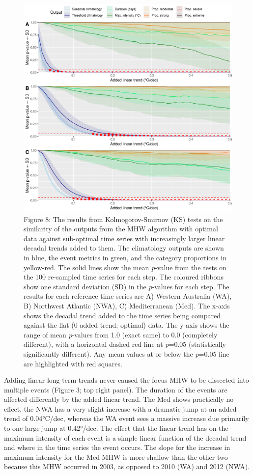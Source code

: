 \documentclass[utf8]{frontiersSCNS} %
\begin{document}
\begin{figure}
\centering
\includegraphics{../LaTeX/fig_8.png}
\caption{Figure 8: The results from Kolmogorov-Smirnov (KS) tests on the
similarity of the outputs from the MHW algorithm with optimal data
against sub-optimal time series with increasingly larger linear decadal
trends added to them. The climatology outputs are shown in blue, the
event metrics in green, and the category proportions in yellow-red. The
solid lines show the mean \emph{p}-value from the tests on the 100
re-sampled time series for each step. The coloured ribbons show one
standard deviation (SD) in the \emph{p}-values for each step. The
results for each reference time series are A) Western Australia (WA), B)
Northwest Atlantic (NWA), C) Mediterranean (Med). The x-axis shows the
decadal trend added to the time series being compared against the flat
(0 added trend; optimal) data. The y-axis shows the range of mean
\emph{p}-values from 1.0 (exact same) to 0.0 (completely different),
with a horizontal dashed red line at \emph{p}=0.05 (statistically
significantly different). Any mean values at or below the \emph{p}=0.05
line are highlighted with red squares.}
\end{figure}

Adding linear long-term trends never caused the focus MHW to be
dissected into multiple events (Figure 3; top right panel). The duration
of the events are affected differently by the added linear trend. The
Med shows practically no effect, the NWA has a very slight increase with
a dramatic jump at an added trend of 0.04°C/dec, whereas the WA event
sees a massive increase due primarily to one large jump at 0.42°/dec.
The effect that the linear trend has on the maximum intensity of each
event is a simple linear function of the decadal trend and where in the
time series the event occurs. The slope for the increase in maximum
intensity for the Med MHW is more shallow than the other two because
this MHW occurred in 2003, as opposed to 2010 (WA) and 2012 (NWA).
\end{document}
